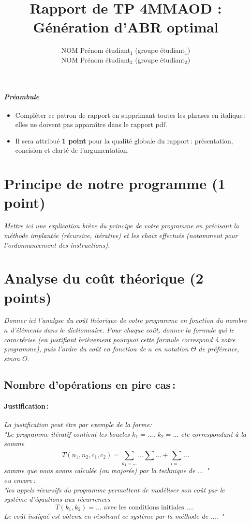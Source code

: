 \documentclass[a4paper, 10pt, french]{article}
\title{Rapport de TP 4MMAOD : Génération d'ABR optimal}
\author{
NOM Prénom étudiant$_1$ (groupe étudiant$_1$) 
\\ NOM Prénom étudiant$_2$ (groupe étudiant$_2$) 
}
\begin{document}
\maketitle

\paragraph{\em Préambule}
{\em \begin{itemize}
    \item Compléter ce patron de rapport en supprimant toutes les phrases en italique\,: elles ne doivent pas apparaître dans le rapport pdf.
    \item Il sera attribué {\bf 1 point} pour la qualité globale du rapport\,: présentation, concision et clarté de l'argumentation.
  \end{itemize}
}

\section{Principe de notre  programme (1 point)}
 {\em Mettre ici une explication brève du principe de votre programme en  précisant la méthode implantée (récursive, itérative) et les
  choix effectués (notamment pour l'ordonnancement des instructions).
 }

\section{Analyse du coût théorique (2 points)}
 {\em Donner ici l'analyse du coût théorique de votre programme en fonction du nombre $n$ d'éléments dans le dictionnaire.
  Pour chaque coût, donner la formule qui le caractérise (en justifiant brièvement pourquoi cette formule correspond à votre programme),
  puis l'ordre du coût en fonction de $n$ en notation $\Theta$ de préférence, sinon $O$.}

\subsection{Nombre  d'opérations en pire cas\,: }
\paragraph{Justification\,: }
{\em La justification peut être par exemple de la forme: \\
  "Le programme itératif contient les boucles $k_1=...$, $k_2= ...$ etc correspondant à la somme
  $$T(n_1, n_2, c_1, c_2) = \sum_{k_1=...}^{...} ... \sum ... + \sum_{i=...}^{...} ...$$
  somme que nous avons calculée (ou majorée) par la technique de  ... " \\
  ou  encore\,:  \\
  "les appels récursifs du programme permettent de modéliser son coût par le système d'équations aux récurrences
  $$T(k_1, k_2) = ...  \mbox{~avec~les~conditions~initiales~....~} $$
  Le coût indiqué est obtenu en résolvant ce système par la méthode de  .... "
}
\end{document}
